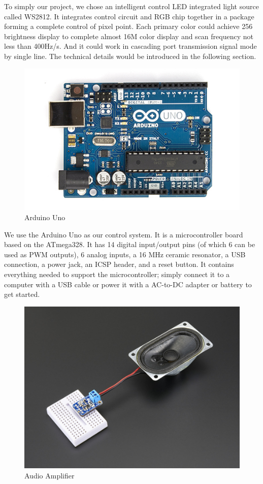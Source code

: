 \documentclass[12pt,a4paper,journal]{IEEEtran}
\begin{document}
To simply our project, we chose an intelligent control LED integrated light source called WS2812. It integrates control circuit and RGB chip together in a package forming a complete control of pixel point. Each primary color could achieve 256 brightness display to complete almost 16M color display and scan frequency not less than 400Hz/s. And it could work in cascading port transmission signal mode by single line. The technical details would be introduced in the following section.
\begin{figure}[ht]
  \centering
  \includegraphics[width=0.9\linewidth]{arduino.jpg}
  \caption{Arduino Uno}
  \label{fig:arduino}
\end{figure}
We use the Arduino Uno as our control system. It is a microcontroller board based on the ATmega328. It has 14 digital input/output pins (of which 6 can be used as PWM outputs), 6 analog inputs, a 16 MHz ceramic resonator, a USB connection, a power jack, an ICSP header, and a reset button. It contains everything needed to support the microcontroller; simply connect it to a computer with a USB cable or power it with a AC-to-DC adapter or battery to get started.
\begin{figure}[ht]
  \centering
  \includegraphics[width=0.9\linewidth]{audioamp.jpg}
  \caption{Audio Amplifier}
  \label{fig:aa}
\end{figure}
\end{document}
